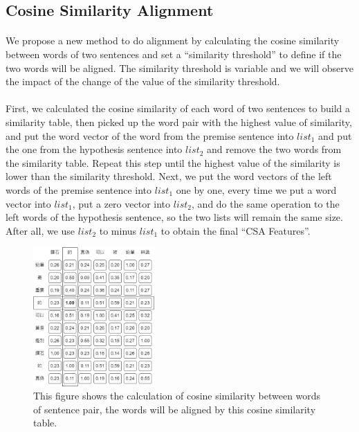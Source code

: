 \documentclass[12pt]{article}
\begin{document}
\begin{CJK*}{UTF8}{bkai}
\begin{spacing}{1.77}
\subsection{Cosine Similarity Alignment} \label{section:csa}
\paragraph{}
We propose a new method to do alignment by calculating the cosine similarity between words of two sentences and set a ``similarity threshold'' to define if the two words will be aligned. The similarity threshold is variable and we will observe the impact of the change of the value of the similarity threshold.

\paragraph{}
First, we calculated the cosine similarity of each word of two sentences to build a similarity table, then picked up the word pair with the highest value of similarity, and put the word vector of the word from the premise sentence into $list_1$ and put the one from the hypothesis sentence into $list_2$ and remove the two words from the similarity table. Repeat this step until the highest value of the similarity is lower than the similarity threshold. Next, we put the word vectors of the left words of the premise sentence into $list_1$ one by one, every time we put a word vector into $list_1$, put a zero vector into $list_2$, and do the same operation to the left words of the hypothesis sentence, so the two lists will remain the same size. After all, we use $list_2$ to minus $list_1$ to obtain the final ``CSA Features''.

\begin{figure}[!ht]
  \centering
  \includegraphics[width=175px]{CSA.png}
  \caption[Cosine Similarity Alignment]{This figure shows the calculation of cosine similarity between words of sentence pair, the words will be aligned by this cosine similarity table.}
  \label{fig:csa}
\end{figure}


\end{spacing}
\end{CJK*}
\end{document}
